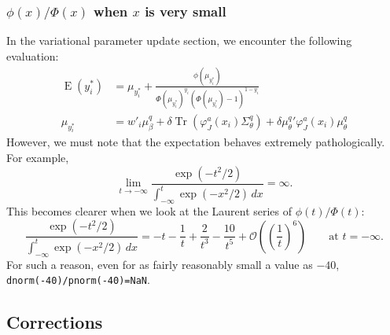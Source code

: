 \documentclass[11pt]{article}
\DeclareMathOperator{\Tr}{Tr}
\newcommand{\opn}{\operatorname}
\begin{document}
\subsubsection{$\phi\left(x\right)/\Phi\left(x\right)$ when $x$ is very small}
In the variational parameter update section, we encounter the following evaluation:
\begin{align*}
  \opn{E}\left(y_{i}^{*}\right) &= \mu_{y_{i}^{*}} + \frac{\phi\left(\mu_{y_{i}^{*}}\right)}{\Phi\left(\mu_{y_{i}^{*}}\right)^{y_{i}}\left(\Phi\left(\mu_{y_{i}^{*}}\right)-1\right)^{1-y_{i}}}\\
  \mu_{y_{i}^{*}} &= w'_{i}\mu_{\beta}^{q} + \delta\Tr\left(\varphi_{J}^{a}\left(x_{i}\right)\Sigma_{\theta}^{q}\right) + \delta{\mu_{\theta}^{q}}'\varphi_{J}^{a}\left(x_{i}\right)\mu_{\theta}^{q}
\end{align*}
However, we must note that the expectation behaves extremely pathologically. For example,
\begin{equation*}
  \lim_{t\to-\infty} \frac{\exp\left(-t^{2}/2\right)}{\int_{-\infty}^{t}\exp\left(-x^{2}/2\right)\, dx} = \infty.
\end{equation*}
This becomes clearer when we look at the Laurent series of $\phi\left(t\right)/\Phi\left(t\right)$:
\begin{equation*}
  \frac{\exp\left(-t^{2}/2\right)}{\int_{-\infty}^{t}\exp\left(-x^{2}/2\right)\, dx} = -t-\frac{1}{t}+\frac{2}{t^{3}} -\frac{10}{t^{5}} + \mathcal{O}\left(\left(\frac{1}{t}\right)^{6}\right)\qquad \text{at $t=-\infty$}.
\end{equation*}
For such a reason, even for as fairly reasonably small a value as $-40$, \texttt{dnorm(-40)/pnorm(-40)=NaN}.
\subsection{Corrections}
\end{document}
